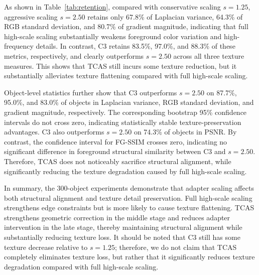 \documentclass[times,twocolumn,final]{elsarticle}
\begin{document}
\begin{table}[t]
\centering
\caption{Texture retention ratios and object-level stability of C3. Texture ratios are measured relative to $s = 1.25$; object-level win rates and confidence intervals for C3 over $s = 2.50$ are reported in the text.}
\label{tab:retention}
\end{table}


As shown in Table~\ref{tab:retention}, compared with conservative scaling $s = 1.25$, aggressive scaling $s = 2.50$ retains only 67.8\% of Laplacian variance, 64.3\% of RGB standard deviation, and 80.7\% of gradient magnitude, indicating that full high-scale scaling substantially weakens foreground color variation and high-frequency details. In contrast, C3 retains 83.5\%, 97.0\%, and 88.3\% of these metrics, respectively, and clearly outperforms $s = 2.50$ across all three texture measures. This shows that TCAS still incurs some texture reduction, but it substantially alleviates texture flattening compared with full high-scale scaling.

Object-level statistics further show that C3 outperforms $s = 2.50$ on 87.7\%, 95.0\%, and 83.0\% of objects in Laplacian variance, RGB standard deviation, and gradient magnitude, respectively. The corresponding bootstrap 95\% confidence intervals do not cross zero, indicating statistically stable texture-preservation advantages. C3 also outperforms $s = 2.50$ on 74.3\% of objects in PSNR. By contrast, the confidence interval for FG-SSIM crosses zero, indicating no significant difference in foreground structural similarity between C3 and $s = 2.50$. Therefore, TCAS does not noticeably sacrifice structural alignment, while significantly reducing the texture degradation caused by full high-scale scaling.

In summary, the 300-object experiments demonstrate that adapter scaling affects both structural alignment and texture detail preservation. Full high-scale scaling strengthens edge constraints but is more likely to cause texture flattening. TCAS strengthens geometric correction in the middle stage and reduces adapter intervention in the late stage, thereby maintaining structural alignment while substantially reducing texture loss. It should be noted that C3 still has some texture decrease relative to $s = 1.25$; therefore, we do not claim that TCAS completely eliminates texture loss, but rather that it significantly reduces texture degradation compared with full high-scale scaling.
\end{document}
